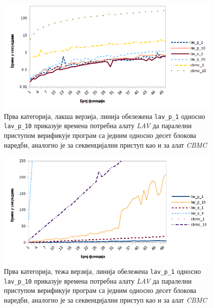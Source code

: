 \documentclass[12pt,oneside]{memoir}
\begin{document}
\newpage
\begin{figure}[!ht]
  \centering
  \includegraphics[scale=0.8]{img/nivo1_master.png}
  \caption{Прва категорија, лакша верзија, линија обележена \texttt{lav\_p\_1} односно \texttt{lav\_p\_10} приказује времена потребна алату \textit{LAV} да паралелни приступом верификује програм са једним односно десет блокова наредби, аналогно је за секвенцијални приступ као и за алат \textit{CBMC}}
  \label{fig:nivo_1}
\end{figure}

\begin{figure}[!ht]
  \centering
  \includegraphics[scale=0.8]{img/nivo1T_master.png}
  \caption{Прва категорија, тежа верзија, линија обележена \texttt{lav\_p\_1} односно \texttt{lav\_p\_10} приказује времена потребна алату \textit{LAV} да паралелни приступом верификује програм са једним односно десет блокова наредби, аналогно је за секвенцијални приступ као и за алат \textit{CBMC}}
  \label{fig:nivo_1t}
\end{figure}
\end{document}
